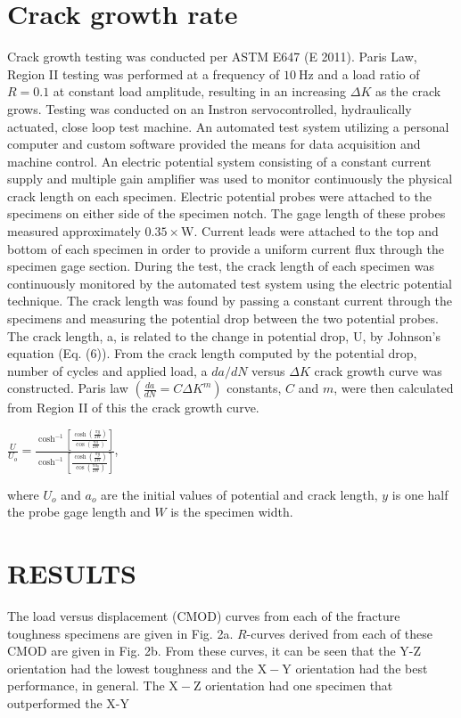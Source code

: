 \documentclass[10pt]{article}
\begin{document}
\section*{Crack growth rate}
Crack growth testing was conducted per ASTM E647 (E 2011). Paris Law, Region II testing was performed at a frequency of $10 \mathrm{~Hz}$ and a load ratio of $R=0.1$ at constant load amplitude, resulting in an increasing $\Delta K$ as the crack grows. Testing was conducted on an Instron servocontrolled, hydraulically actuated, close loop test machine. An automated test system utilizing a personal computer and custom software provided the means for data acquisition and machine control. An electric potential system consisting of a constant current supply and multiple gain amplifier was used to monitor continuously the physical crack length on each specimen. Electric potential probes were attached to the specimens on either side of the specimen notch. The gage length of these probes measured approximately $0.35 \times \mathrm{W}$. Current leads were attached to the top and bottom of each specimen in order to provide a uniform current flux through the specimen gage section. During the test, the crack length of each specimen was continuously monitored by the automated test system using the electric potential technique. The crack length was found by passing a constant current through the specimens and measuring the potential drop between the two potential probes. The crack length, a, is related to the change in potential drop, $\mathrm{U}$, by Johnson's equation (Eq. (6)). From the crack length computed by the potential drop, number of cycles and applied load, a $d a / d N$ versus $\Delta K$ crack growth curve was constructed. Paris law $\left(\frac{d a}{d N}=C \Delta K^{m}\right)$ constants, $C$ and $m$, were then calculated from Region II of this the crack growth curve.

$\frac{U}{U_{o}}=\frac{\cosh ^{-1}\left[\frac{\cosh \left(\frac{\pi y}{2 W}\right)}{\cos \left(\frac{\pi a}{2 W}\right)}\right]}{\cosh ^{-1}\left[\frac{\cosh \left(\frac{\pi y}{2 W}\right)}{\cos \left(\frac{\pi a_{0}}{2 W}\right)}\right]}$,

where $U_{o}$ and $a_{o}$ are the initial values of potential and crack length, $y$ is one half the probe gage length and $W$ is the specimen width.

\section*{RESULTS}
The load versus displacement (CMOD) curves from each of the fracture toughness specimens are given in Fig. 2a. $R$-curves derived from each of these CMOD are given in Fig. 2b. From these curves, it can be seen that the Y-Z orientation had the lowest toughness and the $\mathrm{X}-\mathrm{Y}$ orientation had the best performance, in general. The $\mathrm{X}-\mathrm{Z}$ orientation had one specimen that outperformed the X-Y
\end{document}
